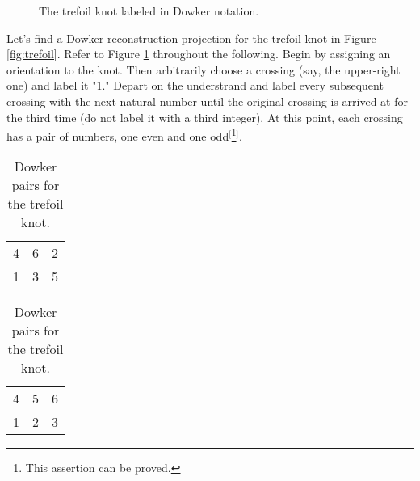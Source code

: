 \documentclass[titlepage]{article}
\begin{document}
\begin{figure}[h!]
    \centering
    \vspace{-2.3em}
    \caption{The trefoil knot labeled in Dowker notation.}
    \label{fig:trefoilDowker}
\end{figure}

Let's find a Dowker reconstruction projection for the trefoil knot in Figure \ref{fig:trefoil}. Refer to Figure \ref{fig:trefoilDowker} throughout the following. Begin by assigning an orientation to the knot. Then arbitrarily choose a crossing (say, the upper-right one) and label it "1." Depart on the understrand and label every subsequent crossing with the next natural number until the original crossing is arrived at for the third time (do not label it with a third integer). At this point, each crossing has a pair of numbers, one even and one odd$^[$\footnote{This assertion can be proved.}$^]$.\par

\begin{table}[h!]
    \centering
    \begin{subtable}[b]{0.3\linewidth}
        \centering
        \begin{tabular}{ccc}
            4 & 6 & 2\\
            1 & 3 & 5
        \end{tabular}
        \caption{Dowker pairing.}
        \label{tab:trefoilDowkera}
    \end{subtable}
    \begin{subtable}[b]{0.3\linewidth}
        \centering
        \begin{tabular}{ccc}
            4 & 5 & 6\\
            1 & 2 & 3
        \end{tabular}
        \caption{Reconstruction pairing.}
        \label{tab:trefoilDowkerb}
    \end{subtable}
    \caption{Dowker pairs for the trefoil knot.}
    \label{tab:trefoilDowker}
\end{table}
\end{document}
